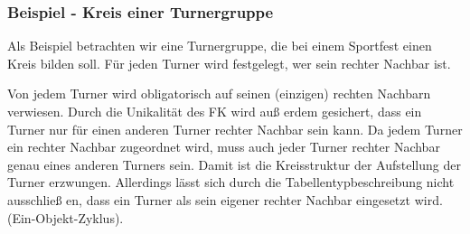      \begin{center}
      \end{center}


        \subsubsection{Beispiel - Kreis einer Turnergruppe}
          Als Beispiel betrachten wir eine Turnergruppe, die bei einem Sportfest einen Kreis bilden soll. Für jeden Turner wird festgelegt, wer sein rechter Nachbar ist.

          Von jedem Turner wird obligatorisch auf seinen (einzigen) rechten Nachbarn verwiesen. Durch die Unikalität des FK wird auß erdem gesichert, dass ein Turner nur für einen anderen Turner rechter Nachbar sein kann. Da jedem Turner ein rechter Nachbar zugeordnet wird, muss auch jeder Turner rechter Nachbar genau eines anderen Turners sein. Damit ist die Kreisstruktur der Aufstellung der Turner erzwungen. Allerdings lässt sich durch die Tabellentypbeschreibung nicht ausschließ en, dass ein Turner als sein eigener rechter Nachbar eingesetzt wird. (Ein-Objekt-Zyklus).

